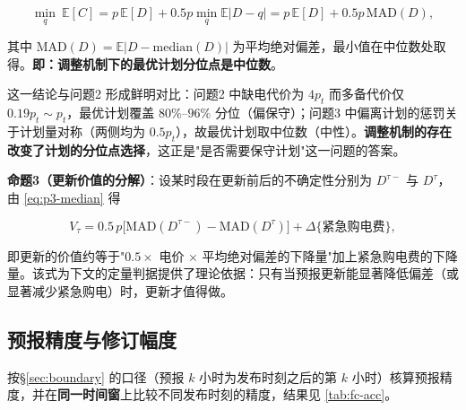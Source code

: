 \begin{equation}
  \min_q\ \mathbb{E}[C]=p\,\mathbb{E}[D]+0.5p\min_q\mathbb{E}|D-q|
  =p\,\mathbb{E}[D]+0.5p\,\mathrm{MAD}(D),
  \label{eq:p3-median}
\end{equation}

其中 $\mathrm{MAD}(D)=\mathbb{E}|D-\mathrm{median}(D)|$ 为平均绝对偏差，最小值在中位数处取得。\textbf{即：调整机制下的最优计划分位点是中位数}。

这一结论与问题2 形成鲜明对比：问题2 中缺电代价为 $4p_t$ 而多备代价仅 $0.19p_t\sim p_t$，最优计划覆盖 $80\%$--$96\%$ 分位（偏保守）；问题3 中偏离计划的惩罚关于计划量对称（两侧均为 $0.5p_t$），故最优计划取中位数（中性）。\textbf{调整机制的存在改变了计划的分位点选择}，这正是"是否需要保守计划"这一问题的答案。

\textbf{命题3（更新价值的分解）}：设某时段在更新前后的不确定性分别为 $D^{\tau-}$ 与 $D^{\tau}$，由 \cref{eq:p3-median} 得

\begin{equation}
  V_\tau=0.5\,p\Big[\mathrm{MAD}(D^{\tau-})-\mathrm{MAD}(D^{\tau})\Big]
  +\Delta\{\text{紧急购电费}\},
  \label{eq:p3-value}
\end{equation}

即更新的价值约等于"$0.5\times$ 电价 $\times$ 平均绝对偏差的下降量"加上紧急购电费的下降量。该式为下文的定量判据提供了理论依据：只有当预报更新能显著降低偏差（或显著减少紧急购电）时，更新才值得做。

\subsection{预报精度与修订幅度}

按\S\ref{sec:boundary} 的口径（预报 $k$ 小时为发布时刻之后的第 $k$ 小时）核算预报精度，并在\textbf{同一时间窗}上比较不同发布时刻的精度，结果见 \cref{tab:fc-acc}。

